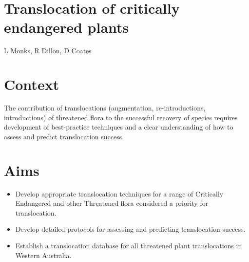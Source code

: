 \documentclass[version=last,
    paper=a4, %
    10pt, %
    usenames,
    dvipsnames,
    oneside, %
    headings=openany, %
    DIV=15 %
]{scrbook}
\begin{document}
\section*{Translocation of critically endangered plants
}

L Monks, R Dillon, D Coates


\section*{Context}
The contribution of translocations (augmentation, re-introductions,
introductions) of threatened flora to the successful recovery of species
requires development of best-practice techniques and a clear
understanding of how to assess and predict translocation success.



\section*{Aims}
\begin{itemize}
\itemsep1pt\parskip0pt
\item
  Develop appropriate translocation techniques for a range of Critically
  Endangered and other Threatened flora considered a priority for
  translocation.
\item
  Develop detailed protocols for assessing and predicting translocation
  success.
\item
  Establish a translocation database for all threatened plant
  translocations in Western Australia.
\end{itemize}
\end{document}
